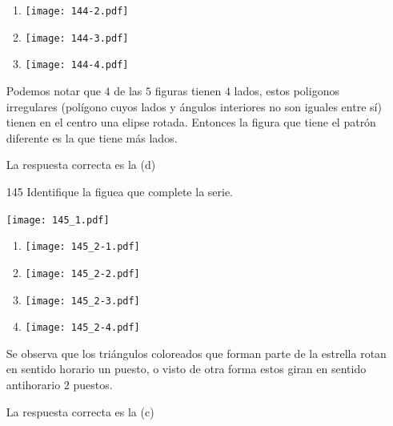 \documentclass[11pt, a4paper]{article} %
\theoremstyle{dotlessP}
\theoremstyle{dotlessS}
\begin{document}
\begin{enumerate}[label=\color{dg}\theenumi.]
\begin{enumerate}
\item
    	 \texttt{[image: 144-2.pdf]}
\item
        	\texttt{[image: 144-3.pdf]}
 \item
           	\texttt{[image: 144-4.pdf]}
\end{enumerate}
  Podemos notar que \(4\) de las \(5\) figuras tienen \(4\) lados, estos poligonos irregulares (polígono cuyos lados y ángulos interiores no son iguales entre sí) tienen en el centro una elipse rotada. Entonces la figura que tiene el patrón diferente es la que tiene más lados.
  
  {\color{dh} La respuesta correcta es la (d)}
  
  \item[145] {\color{db}Identifique la figuea que complete la serie.
}
 \begin{center}
  		\texttt{[image: 145\_1.pdf]}
 \end{center}
 
 \begin{enumerate}
\item 
	    \texttt{[image: 145\_2-1.pdf]}
    
\item
    	\texttt{[image: 145\_2-2.pdf]}
\item
        	\texttt{[image: 145\_2-3.pdf]}
 \item
           	\texttt{[image: 145\_2-4.pdf]}
\end{enumerate}
  Se observa que los triángulos coloreados que forman parte de la estrella rotan en sentido horario  un puesto, o visto de otra forma estos giran en sentido antihorario \(2\) puestos.
  
  
  {\color{dh} La respuesta correcta es la (c)}
\end{enumerate}
\end{document}
